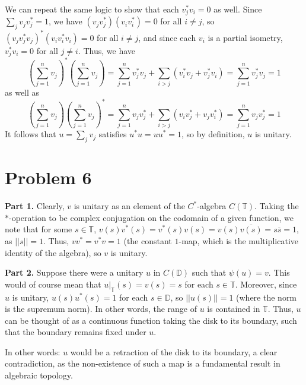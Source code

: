 \documentclass[aps,pra,showpacs,notitlepage,onecolumn,superscriptaddress,nofootinbib]{revtex4-1}
\theoremstyle{definition}
\begin{document}
We can repeat the same logic to show that each $v_j^{*} v_i = 0$ as well. Since $\sum_{j} v_j v_j^{*} = 1$, we have $(v_j v_j^{*})(v_i v_i^{*}) = 0$ for all $i \neq j$, so $(v_j v_j^{*} v_j)^{*}(v_i v_i^{*} v_i) = 0$ for all $i \neq j$,
and since each $v_i$ is a partial isometry, $v_j^{*} v_i = 0$ for all $j \neq i$. Thus, we have
\begin{equation}
  \left( \displaystyle\sum_{j = 1}^{n} v_j \right)^{*} \left( \displaystyle\sum_{j = 1}^{n} v_j \right) = \displaystyle\sum_{j = 1}^{n} v_j^{*} v_j + \displaystyle\sum_{i > j} (v_i^{*} v_j + v_j^{*} v_i) =  \displaystyle\sum_{j = 1}^{n} v_j^{*} v_j = 1
\end{equation}
as well as
\begin{equation}
  \left( \displaystyle\sum_{j = 1}^{n} v_j \right) \left( \displaystyle\sum_{j = 1}^{n} v_j \right)^{*} = \displaystyle\sum_{j = 1}^{n} v_j v_j^{*} + \displaystyle\sum_{i > j} (v_i v_j^{*} + v_j v_i^{*}) =  \displaystyle\sum_{j = 1}^{n} v_j v_j^{*} = 1
\end{equation}
It follows that $u = \sum_{j} v_j$ satisfies $u^{*} u = u u^{*} = 1$, so by definition, $u$ is unitary.

\section{Problem 6}

\noindent \textbf{Part 1.} Clearly, $v$ is unitary as an element of the $C^{*}$-algebra $C(\mathbb{T})$. Taking the $*$-operation to be complex conjugation on the codomain of a given function, we note that
for some $s \in \mathbb{T}$, $v(s) v^{*}(s) = v^{*}(s) v(s) = v(s) \overline{v(s)} = s \overline{s} = 1$, as $||s|| = 1$. Thus, $v v^{*} = v^{*} v = 1$ (the constant $1$-map, which is the multiplicative identity of the algebra), so $v$ is unitary.
\newline

\noindent \textbf{Part 2.} Suppose there were a unitary $u$ in $C(\mathbb{D})$ such that $\psi(u) = v$. This would of course mean that $u|_{\mathbb{T}}(s) = v(s) = s$ for each $s \in \mathbb{T}$. Moreover,
since $u$ is unitary, $u(s) u^{*}(s) = 1$ for each $s \in \mathbb{D}$, so $||u(s)|| = 1$ (where the norm is the supremum norm). In other words, the range of $u$ is contained in $\mathbb{T}$. Thus, $u$ can
be thought of as a continuous function taking the disk to its boundary, such that the boundary remains fixed under $u$.

In other words: $u$ would be a retraction of the disk to its boundary, a clear contradiction, as the non-existence of such a map is a fundamental result in algebraic topology.
\newline
\end{document}
